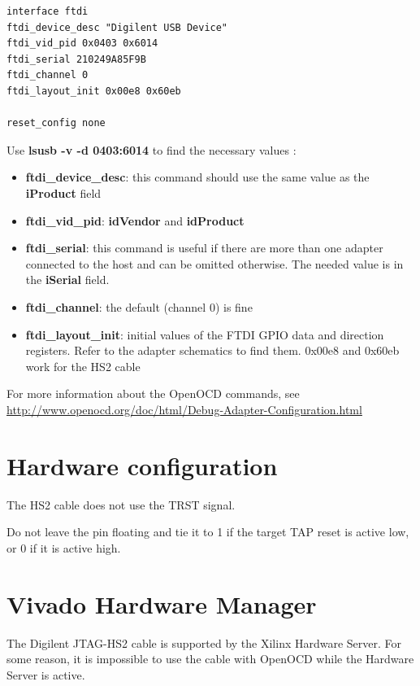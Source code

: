 \documentclass{article}
\begin{document}
	\begin{lstlisting}
interface ftdi
ftdi_device_desc "Digilent USB Device"
ftdi_vid_pid 0x0403 0x6014
ftdi_serial 210249A85F9B
ftdi_channel 0						
ftdi_layout_init 0x00e8 0x60eb

reset_config none
    \end{lstlisting}
    
    Use \textbf{lsusb -v -d 0403:6014} to find the necessary values :
    
    \vspace{-\topsep}
	\begin{itemize}
	\item \textbf{ftdi\_device\_desc}: this command should use the same value as the \textbf{iProduct} field
	
	\item \textbf{ftdi\_vid\_pid}: \textbf{idVendor} and \textbf{idProduct}
	
	\item \textbf{ftdi\_serial}: this command is useful if there are more than one adapter connected to the host and can be omitted otherwise. The needed value is in the \textbf{iSerial} field.
	
	\item \textbf{ftdi\_channel}: the default (channel 0) is fine
	
	\item \textbf{ftdi\_layout\_init}: initial values of the FTDI GPIO data and direction registers. Refer to the adapter schematics to find them. 0x00e8 and 0x60eb work for the HS2 cable
	\end{itemize}
	
	For more information about the OpenOCD commands, see \url{http://www.openocd.org/doc/html/Debug-Adapter-Configuration.html}
	
	\section{Hardware configuration}
	
	The HS2 cable does not use the TRST signal. 
	
	Do not leave the pin floating and tie it to 1 if the target TAP reset is active low, or 0 if it is active high.
	
	\section{Vivado Hardware Manager}
	
	The Digilent JTAG-HS2 cable is supported by the Xilinx Hardware Server. For some reason, it is impossible to use the cable with OpenOCD while the Hardware Server is active.
	
\end{document}
